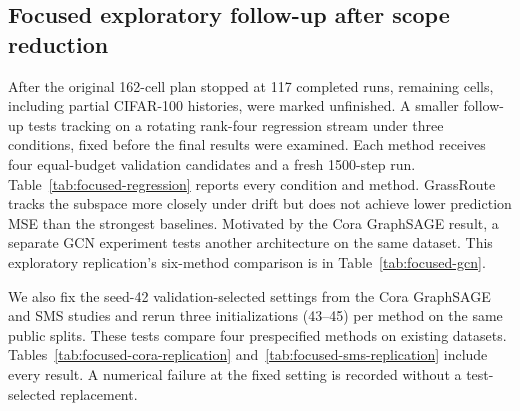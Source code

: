 \subsection{Focused exploratory follow-up after scope reduction}
\label{app:focused-followup}
After the original 162-cell plan stopped at 117 completed runs, remaining
cells, including partial CIFAR-100 histories, were marked unfinished.
A smaller follow-up tests tracking on a rotating rank-four regression stream
under three conditions, fixed before the final results were examined.
Each method receives four equal-budget validation candidates and a fresh
1500-step run. Table~\ref{tab:focused-regression} reports every condition
and method. GrassRoute tracks the subspace more closely under drift but
does not achieve lower prediction MSE than the strongest baselines.
Motivated by the Cora GraphSAGE result, a separate GCN experiment tests
another architecture on the same dataset. This exploratory replication's
six-method comparison is in Table~\ref{tab:focused-gcn}.



We also fix the seed-42 validation-selected settings from the Cora
GraphSAGE and SMS studies and rerun three initializations (43--45) per
method on the same public splits. These tests compare four prespecified
methods on existing datasets. Tables~\ref{tab:focused-cora-replication}
and~\ref{tab:focused-sms-replication} include every result. A numerical
failure at the fixed setting is recorded without a test-selected replacement.








